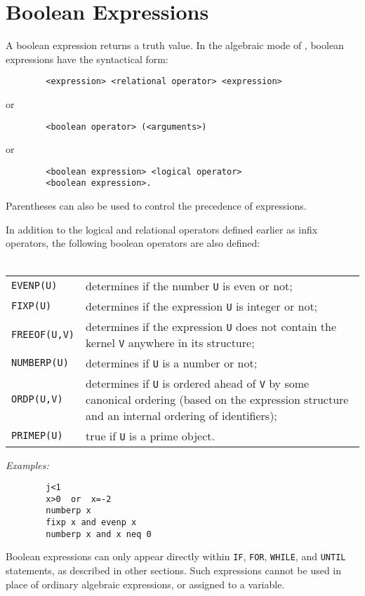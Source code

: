 \section{Boolean Expressions}
\label{sec-boolean}
A boolean expression returns a truth value.  In the
algebraic mode of {\REDUCE}, boolean expressions have the syntactical form:
\begin{verbatim}
        <expression> <relational operator> <expression>
\end{verbatim}
or
\begin{verbatim}
        <boolean operator> (<arguments>)
\end{verbatim}
or
\begin{verbatim}
        <boolean expression> <logical operator>
        <boolean expression>.
\end{verbatim}
Parentheses can also be used to control the precedence of expressions.

In addition to the logical and relational operators defined earlier as
infix operators, the following boolean operators are also defined:\\
\mbox{}\\
{\renewcommand{\arraystretch}{2}
\begin{tabular}{lp{\redboxwidth}}
{\tt EVENP(U)} & determines if the number {\tt U} is even or not; \\

{\tt FIXP(U)} & determines if the expression {\tt U} is integer or not; \\

{\tt FREEOF(U,V)} & determines if the expression
{\tt U} does not contain the kernel {\tt V} anywhere in its
structure; \\

{\tt NUMBERP(U)} & determines if {\tt U} is a number or not; \\

{\tt ORDP(U,V)} & determines if {\tt U} is ordered
ahead of {\tt V} by some canonical ordering (based on the expression structure
and an internal ordering of identifiers); \\

{\tt PRIMEP(U)} & true if {\tt U} is a prime object. \\
\end{tabular}}

{\it Examples:}
\begin{verbatim}
        j<1
        x>0  or  x=-2
        numberp x
        fixp x and evenp x
        numberp x and x neq 0
\end{verbatim}
Boolean expressions can only appear directly within {\tt IF}, {\tt FOR},
{\tt WHILE}, and {\tt UNTIL} statements, as described in other sections.
Such expressions cannot be used in place of ordinary algebraic expressions,
or assigned to a variable.

